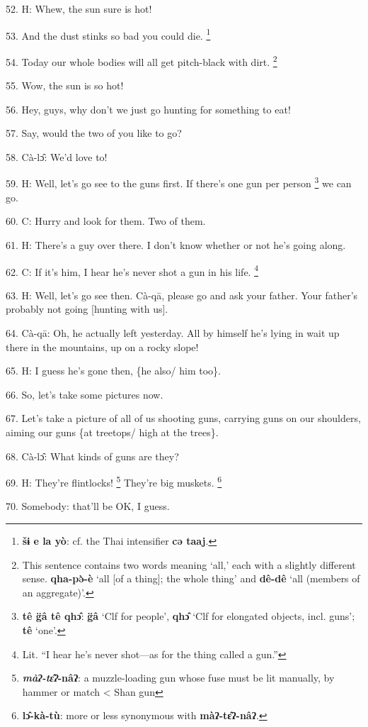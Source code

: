 52. H: Whew, the sun sure is hot!

53. And the dust stinks so bad you could die. \footnote{\textbf{šɨ e la yò}: cf. the Thai intensifier \textbf{cə taaj}.}

54. Today our whole bodies will all get pitch-black with dirt. \footnote{This sentence contains two words meaning `all,' each with a slightly different sense. \textbf{qha-pə̀-è }`all [of a thing]; the whole thing' and \textbf{dê-dê }`all (members of an aggregate)'.}

55. Wow, the sun is so hot!

56. Hey, guys, why don't we just go hunting for something to eat!

57. Say, would the two of you like to go?

58. Cà-lɔ̂: We'd love to!

59. H: Well, let's go see to the guns first. If there's one gun per person \footnote{\textbf{tê g̈â tê qhɔ̂}:\textbf{ g̈â} `Clf for people', \textbf{qhɔ̂} `Clf for elongated objects, incl. guns'; \textbf{tê} `one'.}
we can go.

60. C: Hurry and look for them. Two of them.

61. H: There's a guy over there. I don't know whether or not he's going along.

62. C: If it's him, I hear he's never shot a gun in his life. \footnote{Lit. ``I hear he's never shot---as for the thing called a gun.''}

63. H: Well, let's go see then. Cà-qā, please go and ask your father. Your father's
probably not going [hunting with us].

64. Cà-qā: Oh, he actually left yesterday. All by himself he's lying in wait
up there in the mountains, up on a rocky slope!

65. H: I guess he's gone then, \{he also/ him too\}.

66. So, let's take some pictures now.

67. Let's take a picture of all of us shooting guns, carrying guns on our shoulders,
aiming our guns \{at treetops/ high at the trees\}.

68. Cà-lɔ̂: What kinds of guns are they?

69. H: They're flintlocks! \footnote{\textbf{\emph{màʔ-tɛ̂ʔ}}\textbf{-nâʔ}: a muzzle-loading gun whose fuse must be lit manually, by hammer or match  < Shan    gun} They're big muskets. \footnote{\textbf{lɔ̂-kà-tù}: more or less synonymous with \textbf{màʔ-tɛ̂ʔ-nâʔ}.}

70. Somebody: that'll be OK, I guess.

